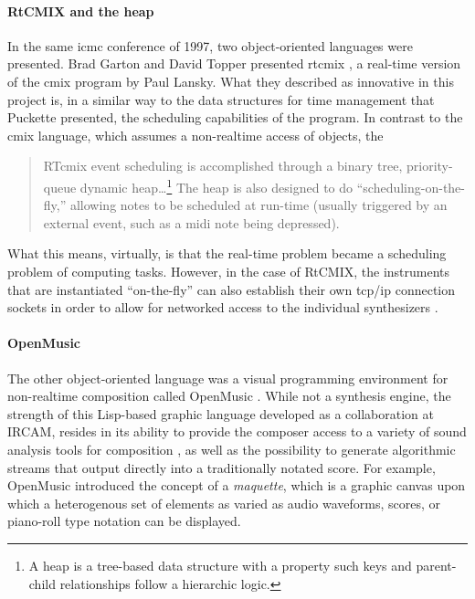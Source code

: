 	\paragraph{RtCMIX and the heap}
	\label{computer:rtcmix}

	In the same \gls{icmc} conference of 1997, two object-oriented languages were presented. Brad Garton and David Topper presented \gls{rtcmix} \parencite{DBLP:conf/icmc/GartonT97}, a real-time version of the \gls{cmix} program by Paul Lansky. What they described as innovative in this project is, in a similar way to the data structures for time management that Puckette presented, the scheduling capabilities of the program. In contrast to the \gls{cmix} language, which assumes a non-realtime access of objects, the

	\begin{quote}
		RTcmix event scheduling is accomplished through a binary tree, priority-queue dynamic heap\dots\footnote{A heap is a tree-based data structure with a property such keys and parent-child relationships follow a hierarchic logic.} The heap is also designed to do ``scheduling-on-the-fly,'' allowing notes to be scheduled at run-time (usually triggered by an external event, such as a \gls{midi} note being depressed). \parencite{DBLP:conf/icmc/GartonT97}
	\end{quote}

	What this means, virtually, is that the real-time problem became a scheduling problem of computing tasks. However, in the case of RtCMIX, the instruments that are instantiated ``on-the-fly'' can also establish their own \gls{tcp/ip} connection sockets in order to allow for networked access to the individual synthesizers \parencite{DBLP:conf/icmc/GartonT97}.

	\paragraph{OpenMusic}
	\label{computer:openmusic}

	The other object-oriented language was a visual programming environment for non-realtime composition called OpenMusic \parencite{DBLP:conf/icmc/AssayagAFH97}. While not a synthesis engine, the strength of this Lisp-based graphic language developed as a collaboration at IRCAM, resides in its ability to provide the composer access to a variety of sound analysis tools for composition \parencite{icmc/bbp2372.2004.004, icmc/bbp2372.2010.129}, as well as the possibility to generate algorithmic streams that output directly into a traditionally notated score. For example, OpenMusic introduced the concept of a \textit{maquette}, which is a graphic canvas upon which a heterogenous set of elements as varied as audio waveforms, scores, or piano-roll type notation can be displayed.

